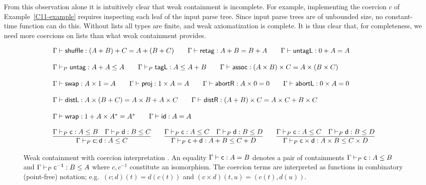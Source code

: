 From this observation alone it is intuitively clear that weak containment is incomplete. For example, implementing the coercion $c$ of 
Example~\ref{C11-example} requires inspecting each leaf of the input parse tree.  Since input parse trees are of unbounded size, no constant-time function can do this.  Without lists all types are finite, and weak axiomatization is complete. It is thus clear that, for completeness, we need more coercions on lists than what weak containment provides.

\begin{figure}
\label{fig:HN}
\begin{displaymath}
\begin{array}{lll}
\myaxiomC{shuffle}{(A + B) + C}{A + (B + C)} \qquad  
\myaxiomC{retag}{A + B}{B + A} \qquad 
\myaxiomC{untagL}{0 + A}{A} 
\\\\
\containsG{untag}{A + A}{A}   \qquad \containsG{tagL}{A}{A + B} \qquad

\myaxiomC{assoc}{(A \times B) \times C}{A \times (B \times C)}
\\\\
\myaxiomC{swap}{A \times 1}{A} \qquad
\myaxiomC{proj}{1 \times A}{A} \qquad
\myaxiomC{abortR}{A \times 0}{0} \qquad
\myaxiomC{abortL}{0 \times A}{0} 
\\\\
\myaxiomC{distL}{A \times (B + C)} {A \times B + A \times C} \qquad
\myaxiomC{distR}{(A + B)\times C}{A \times C + B \times C} 
\\\\
\myaxiomC{wrap}{1 + A \times A^*}{A^* } \qquad \myaxiomC{id}{A}{A}
\\\\
\infer{\containsG{c;d}{A}{C}}{\containsG{c}{A}{B} & \containsG{d}{B}{C}} \qquad

\infer{\containsG{c + d}{A + B}{ C + D}}{\containsG{c}{A}{C} & \containsG{d}{B}{D}}  \qquad

\infer{\containsG{c \times d}{A \times B}{ C \times D}}{\containsG{c}{A}{C} & \containsG{d}{B}{D}} 
\end{array}
\end{displaymath}
\caption{Weak containment with coercion interpretation \cite{heni2011}.  An equality 
$\Gamma \vdash \mathsf{c} : A = B$ denotes a pair of containments $\Gamma \vdash_P \mathsf{c} : A \leq B$ and $\Gamma \vdash_P \mathsf{c^{-1}} : B \leq A$ where $c, c^{-1}$ constitute an isomorphism.  The coercion terms are interpreted as functions in combinatory (point-free) notation; e.g.~$(c ; d)(t) = d(c(t))$
and $(c \times d)(t, u) = (c(t), d(u))$.}
\end{figure}

